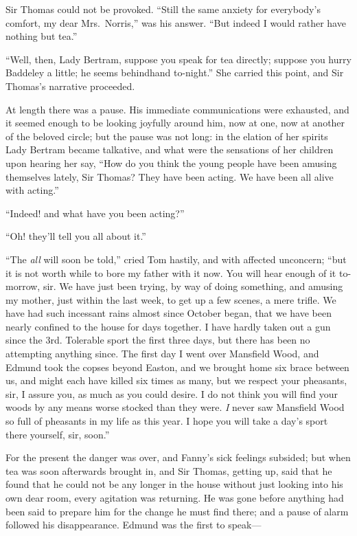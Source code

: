 Sir Thomas could not be provoked.  ``Still the same
anxiety for everybody's comfort, my dear Mrs.\ Norris,''
was his answer.  ``But indeed I would rather have nothing
but tea.''

``Well, then, Lady Bertram, suppose you speak for
tea directly; suppose you hurry Baddeley a little;
he seems behindhand to-night.'' She carried this point,
and Sir Thomas's narrative proceeded.

At length there was a pause.  His immediate communications
were exhausted, and it seemed enough to be looking joyfully
around him, now at one, now at another of the beloved circle;
but the pause was not long:  in the elation of her
spirits Lady Bertram became talkative, and what were
the sensations of her children upon hearing her say,
``How do you think the young people have been amusing
themselves lately, Sir Thomas?  They have been acting.
We have been all alive with acting.''

``Indeed! and what have you been acting?''

``Oh! they'll tell you all about it.''

``The \emph{all} will soon be told,'' cried Tom hastily,
and with affected unconcern; ``but it is not worth
while to bore my father with it now.  You will hear
enough of it to-morrow, sir.  We have just been trying,
by way of doing something, and amusing my mother,
just within the last week, to get up a few scenes,
a mere trifle.  We have had such incessant rains almost
since October began, that we have been nearly confined
to the house for days together.  I have hardly taken out
a gun since the 3rd.  Tolerable sport the first three days,
but there has been no attempting anything since.
The first day I went over Mansfield Wood, and Edmund took
the copses beyond Easton, and we brought home six brace
between us, and might each have killed six times as many,
but we respect your pheasants, sir, I assure you,
as much as you could desire.  I do not think you will find
your woods by any means worse stocked than they were.
\emph{I} never saw Mansfield Wood so full of pheasants in my
life as this year.  I hope you will take a day's sport
there yourself, sir, soon.''

For the present the danger was over, and Fanny's sick
feelings subsided; but when tea was soon afterwards
brought in, and Sir Thomas, getting up, said that he found
that he could not be any longer in the house without
just looking into his own dear room, every agitation
was returning.  He was gone before anything had been
said to prepare him for the change he must find there;
and a pause of alarm followed his disappearance.
Edmund was the first to speak---%


